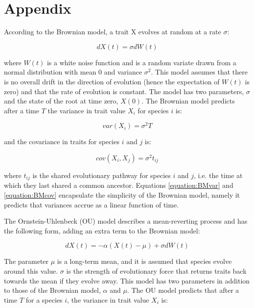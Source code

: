 \documentclass[a4paper,12pt]{article}
\begin{document}



\section{Appendix}
  \label{section:models}
  \setcounter{equation}{0}

  According to the Brownian model, a trait X evolves at random at a rate $\sigma$:

    \begin{equation}
      dX(t) = \sigma dW(t)
      \label{equation:BMrate} 
    \end{equation}

  where $W(t)$ is a white noise function and is a random variate drawn from a normal distribution with mean $0$ and variance $\sigma^2$. 
  This model assumes that there is no overall drift in the direction of evolution (hence the expectation of $W(t)$ is zero) and that the rate of evolution is constant. 
  The model has two parameters, $\sigma$ and the state of the root at time zero, $X(0)$. 
  The Brownian model predicts after a time $T$ the variance in trait value $X_i$ for species $i$ is:

    \begin{equation}
      var(X_i) = \sigma^2 T
      \label{equation:BMvar} 
    \end{equation}

  and the covariance in traits for species $i$ and $j$ is:
  
    \begin{equation}
      cov(X_i,X_j) = \sigma^2 t_{ij}
      \label{equation:BMcov} 
    \end{equation}

  where $t_{ij}$ is the shared evolutionary pathway for species $i$ and $j$, i.e. the time at which they last shared a common ancestor. 
  Equations \ref{equation:BMvar} and \ref{equation:BMcov} encapsulate the simplicity of the Brownian model, namely it predicts that variances accrue as a linear function of time. 

  The Ornstein-Uhlenbeck (OU) model describes a mean-reverting process and has the following form, adding an extra term to the Brownian model:

  \begin{equation}
    dX(t) = - \alpha (X(t) - \mu) + \sigma dW(t)
    \label{equation:OUrate} 
  \end{equation}

  The parameter $\mu$ is a long-term mean, and it is assumed that species evolve around this value. 
  $\sigma$ is the strength of evolutionary force that returns traits back towards the mean if they evolve away. 
  This model has two parameters in addition to those of the Brownian model, $\alpha$ and $\mu$.
  The OU model predicts that after a time $T$ for a species $i$, the variance in trait value $X_i$ is:
\end{document}
